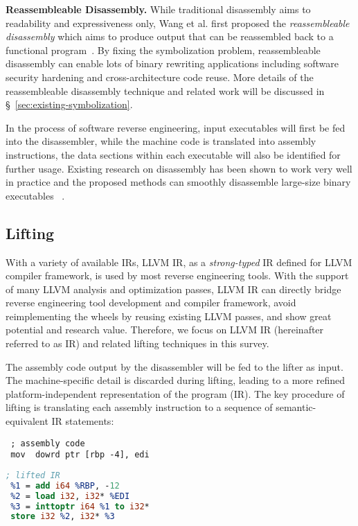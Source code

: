 \noindent \textbf{Reassembleable Disassembly.} While traditional disassembly
aims to readability and expressiveness only, Wang et al. first proposed the
\textit{reassembleable disassembly} which aims to produce output that can be
reassembled back to a functional program~\cite{wang2015reassembleable}. By
fixing the symbolization problem, reassembleable disassembly can enable lots
of binary rewriting applications including software security hardening and
cross-architecture code reuse. More details of the reassembleable disassembly
technique and related work will be discussed in \S~\ref{sec:existing-symbolization}.

In the process of software reverse engineering, input executables will first be
fed into the disassembler, while the machine code is translated into assembly
instructions, the data sections within each executable will also be identified
for further usage. Existing research on disassembly has been shown to work
very well in practice and the proposed methods can smoothly disassemble
large-size binary executables
~\cite{balakrishnan2010wysinwyx,kruegel2004static,wang2015reassembleable}.

\subsection{Lifting} \label{subsec:background-lifting}

With a variety of available IRs, LLVM IR, as a \textit{strong-typed} IR
defined for LLVM compiler framework, is used by most reverse engineering
tools. With the support of many LLVM analysis and optimization passes, LLVM IR
can directly bridge reverse engineering tool development and compiler
framework, avoid reimplementing the wheels by reusing existing LLVM passes,
and show great potential and research value. Therefore, we focus on LLVM IR
(hereinafter referred to as IR) and related lifting techniques in this survey.

The assembly code output by the disassembler will be fed to the lifter as
input. The machine-specific detail is discarded during lifting, leading to a
more refined platform-independent representation of the program (IR). The key
procedure of lifting is translating each assembly instruction to a sequence of
semantic-equivalent IR statements:

\vspace*{3pt}
\noindent\hspace*{36pt}\begin{minipage}{.40\linewidth}
\begin{lstlisting}
 ; assembly code
 mov  dowrd ptr [rbp -4], edi
\end{lstlisting}
\end{minipage}\hspace*{24pt}
\begin{minipage}{.40\linewidth}
\begin{lstlisting}[language=llvm]
 ; lifted IR
 %1 = add i64 %RBP, -12
 %2 = load i32, i32* %EDI
 %3 = inttoptr i64 %1 to i32*
 store i32 %2, i32* %3
\end{lstlisting}
\end{minipage}

